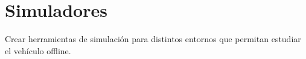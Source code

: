 \chapter{Simuladores}
Crear herramientas de simulación para distintos entornos que permitan estudiar el vehículo offline.
\afterpage{\blankpage}